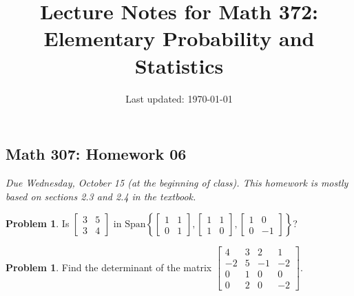 \documentclass[10pt]{article}
\title{Lecture Notes for Math 372: \\Elementary Probability and Statistics}
\date{Last updated: \today}
\theoremstyle{definition}
\newtheorem{problem}[theorem]{Problem}
\newcommand{\1}[1]{\textbf{1}_{\left[#1\right]}} %
\begin{document}
\begin{center}
  \section*{Math 307: Homework 06}
  \textit{Due Wednesday, October 15 (at the beginning of class). This homework
  is mostly based on sections 2.3 and 2.4 in the textbook.}
\end{center}




\begin{problem}
  Is $
  \begin{bmatrix}
    3&5\\3&4
  \end{bmatrix}
  $ in $\text{Span} \left\{
    \begin{bmatrix}
      1&1\\
      0&1
    \end{bmatrix},
    \begin{bmatrix}
      1&1\\
      1&0
    \end{bmatrix},
    \begin{bmatrix}
      1&0\\
      0&-1
    \end{bmatrix}
  \right\}$?
\end{problem}


\begin{problem}
  Find the determinant of the matrix $
  \begin{bmatrix}
    4&3&2&1\\
    -2&5&-1&-2\\
    0&1&0&0\\
    0&2&0&-2
  \end{bmatrix}.
  $
\end{problem}
\end{document}
